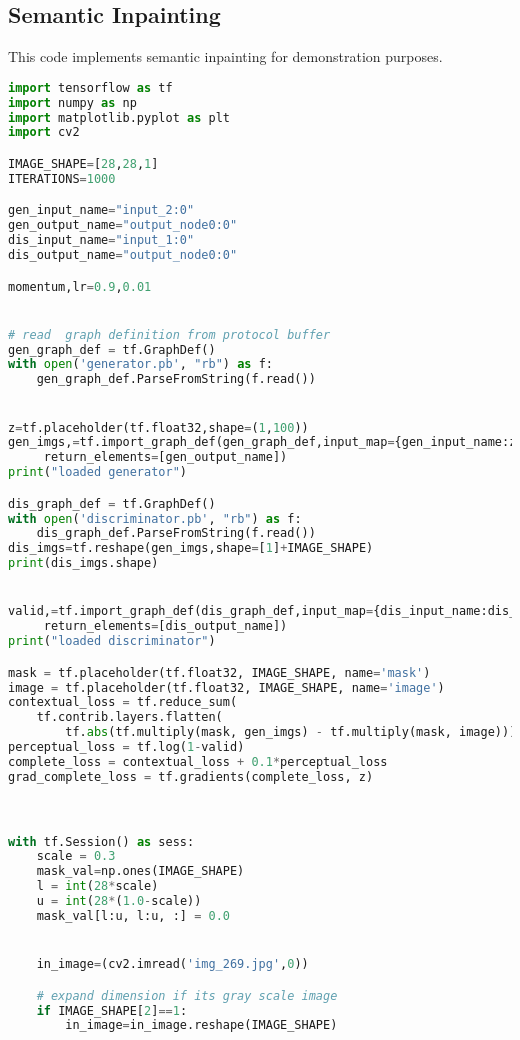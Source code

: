 
\subsection{Semantic Inpainting} %
\label{sub:semantic_inpainting}
This code implements semantic inpainting for demonstration purposes.
\begin{lstlisting}[basicstyle=\scriptsize,language=Python]
import tensorflow as tf
import numpy as np
import matplotlib.pyplot as plt
import cv2

IMAGE_SHAPE=[28,28,1]
ITERATIONS=1000

gen_input_name="input_2:0"
gen_output_name="output_node0:0"
dis_input_name="input_1:0"
dis_output_name="output_node0:0"

momentum,lr=0.9,0.01


# read  graph definition from protocol buffer
gen_graph_def = tf.GraphDef()
with open('generator.pb', "rb") as f:
    gen_graph_def.ParseFromString(f.read())


z=tf.placeholder(tf.float32,shape=(1,100))
gen_imgs,=tf.import_graph_def(gen_graph_def,input_map={gen_input_name:z},
     return_elements=[gen_output_name])
print("loaded generator")

dis_graph_def = tf.GraphDef()
with open('discriminator.pb', "rb") as f:
    dis_graph_def.ParseFromString(f.read())
dis_imgs=tf.reshape(gen_imgs,shape=[1]+IMAGE_SHAPE)
print(dis_imgs.shape)


valid,=tf.import_graph_def(dis_graph_def,input_map={dis_input_name:dis_imgs},
     return_elements=[dis_output_name])
print("loaded discriminator")

mask = tf.placeholder(tf.float32, IMAGE_SHAPE, name='mask')
image = tf.placeholder(tf.float32, IMAGE_SHAPE, name='image')
contextual_loss = tf.reduce_sum(
    tf.contrib.layers.flatten(
        tf.abs(tf.multiply(mask, gen_imgs) - tf.multiply(mask, image))), 1)
perceptual_loss = tf.log(1-valid)
complete_loss = contextual_loss + 0.1*perceptual_loss
grad_complete_loss = tf.gradients(complete_loss, z)



with tf.Session() as sess:
    scale = 0.3
    mask_val=np.ones(IMAGE_SHAPE)
    l = int(28*scale)
    u = int(28*(1.0-scale))
    mask_val[l:u, l:u, :] = 0.0


    in_image=(cv2.imread('img_269.jpg',0))

    # expand dimension if its gray scale image
    if IMAGE_SHAPE[2]==1:
        in_image=in_image.reshape(IMAGE_SHAPE)


\end{lstlisting}
